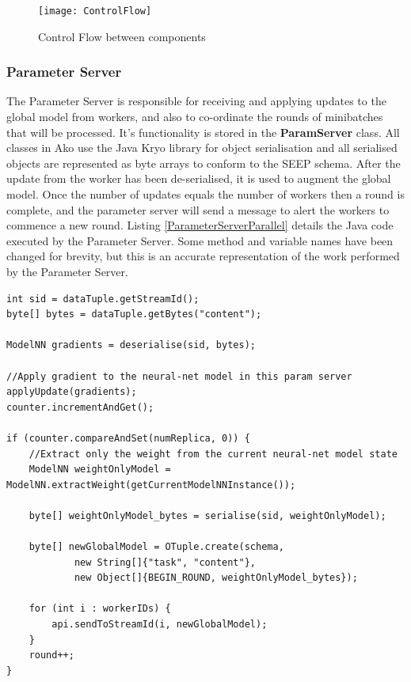 \documentclass[12pt]{article}
\begin{document}
\begin{figure}[H]
  \centering
  \texttt{[image: ControlFlow]}
  \caption[]{Control Flow between components}
  \label{ControlFlow}
\end{figure}

\subsubsection{Parameter Server}

The Parameter Server is responsible for receiving and applying updates to the global model from workers, and also to co-ordinate the rounds of minibatches that will be processed. It's functionality is stored in the \textbf{ParamServer} class.
\newline
\newline
All classes in Ako use the Java Kryo library \cite{kryo} for object serialisation and all serialised objects are represented as byte arrays to conform to the SEEP schema. After the update from the worker has been de-serialised, it is used to augment the global model. Once the number of updates equals the number of workers then a round is complete, and the parameter server will send a message to alert the workers to commence a new round.
\newline
\newline
Listing \ref{ParameterServerParallel} details the Java code executed by the Parameter Server. Some method and variable names have been changed for brevity, but this is an accurate representation of the work performed by the Parameter Server.

\begin{lstlisting}[caption={Parameter Server message handling},label=ParameterServerParallel]
int sid = dataTuple.getStreamId();
byte[] bytes = dataTuple.getBytes("content");

ModelNN gradients = deserialise(sid, bytes);

//Apply gradient to the neural-net model in this param server
applyUpdate(gradients);
counter.incrementAndGet();

if (counter.compareAndSet(numReplica, 0)) {
    //Extract only the weight from the current neural-net model state
    ModelNN weightOnlyModel = ModelNN.extractWeight(getCurrentModelNNInstance());

    byte[] weightOnlyModel_bytes = serialise(sid, weightOnlyModel);

    byte[] newGlobalModel = OTuple.create(schema,
            new String[]{"task", "content"},
            new Object[]{BEGIN_ROUND, weightOnlyModel_bytes});

    for (int i : workerIDs) {
        api.sendToStreamId(i, newGlobalModel);
    }
    round++;
}
\end{lstlisting}
\end{document}
